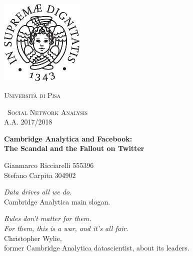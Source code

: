 \begin{titlepage}
    \centering
    \includegraphics[width=0.30\textwidth]{images/cherubino_black.pdf}\par\vspace{1cm}
    {\scshape\LARGE Università di Pisa \par}
    \vspace{1cm}
    {\scshape\ Social Network Analysis \\A.A. 2017/2018\par}
    \vspace{1.5cm}
    {\huge\bfseries Cambridge Analytica and Facebook: \\ The Scandal and the Fallout on Twitter\\ \par}
    \vspace{2cm}
    {\Large Gianmarco Ricciarelli 555396 \\ Stefano Carpita 304902 \par}
    \vfill

\begin{flushright}    
  \textit{Data drives all we do.}\\
\vspace{2 mm}
Cambridge Analytica main slogan.
\end{flushright}

\vspace{4 mm}
    
\begin{flushright}    
  \textit{Rules don’t matter for them. \\ For them, this is a war, and it’s all fair.}\\
\vspace{2 mm}
  Christopher Wylie, \\ former Cambridge Analytica datascientist, about its leaders.
\end{flushright}




  \end{titlepage}

